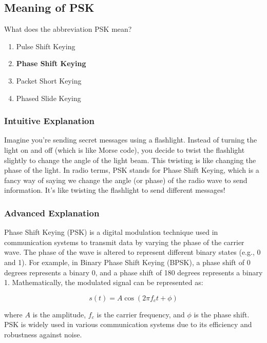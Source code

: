 \subsection{Meaning of PSK}\label{T8D06}

\begin{tcolorbox}[colback=gray!10!white,colframe=black!75!black,title=T8D06]
What does the abbreviation PSK mean?
\begin{enumerate}[label=\Alph*)]
    \item Pulse Shift Keying
    \item \textbf{Phase Shift Keying}
    \item Packet Short Keying
    \item Phased Slide Keying
\end{enumerate}
\end{tcolorbox}

\subsubsection{Intuitive Explanation}
Imagine you're sending secret messages using a flashlight. Instead of turning the light on and off (which is like Morse code), you decide to twist the flashlight slightly to change the angle of the light beam. This twisting is like changing the phase of the light. In radio terms, PSK stands for Phase Shift Keying, which is a fancy way of saying we change the angle (or phase) of the radio wave to send information. It's like twisting the flashlight to send different messages!

\subsubsection{Advanced Explanation}
Phase Shift Keying (PSK) is a digital modulation technique used in communication systems to transmit data by varying the phase of the carrier wave. The phase of the wave is altered to represent different binary states (e.g., 0 and 1). For example, in Binary Phase Shift Keying (BPSK), a phase shift of 0 degrees represents a binary 0, and a phase shift of 180 degrees represents a binary 1. Mathematically, the modulated signal can be represented as:

\[
s(t) = A \cos(2\pi f_c t + \phi)
\]

where \( A \) is the amplitude, \( f_c \) is the carrier frequency, and \( \phi \) is the phase shift. PSK is widely used in various communication systems due to its efficiency and robustness against noise.

